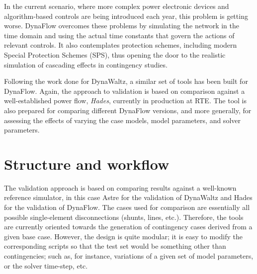 \documentclass[conference]{IEEEtran}
\begin{document}
In the current scenario, where more complex power electronic devices and
algorithm-based controls are being introduced each year, this problem is getting
worse. DynaFlow overcomes these problems by simulating the network in the time
domain and using the actual time constants that govern the actions of relevant
controls. It also contemplates protection schemes, including modern Special
Protection Schemes (SPS), thus opening the door to the realistic simulation of
cascading effects in contingency studies.

Following the work done for DynaWaltz, a similar set of tools has been built for
DynaFlow.  Again, the approach to validation is based on comparison against a
well-established power flow, \emph{Hades}, currently in production at RTE. The
tool is also prepared for comparing different DynaFlow versions, and more
generally, for assessing the effects of varying the case models, model
parameters, and solver parameters.




\section{Structure and workflow}

The validation approach is based on comparing results against a well-known
reference simulator, in this case Astre for the validation of DynaWaltz and
Hades for the validation of DynaFlow. The cases used for comparison are
essentially all possible single-element disconnections (shunts, lines,
etc.). Therefore, the tools are currently oriented towards the generation of
contingency cases derived from a given base case. However, the design is quite
modular; it is easy to modify the corresponding scripts so that the test set
would be something other than contingencies; such as, for instance, variations
of a given set of model parameters, or the solver time-step, etc.
\end{document}
